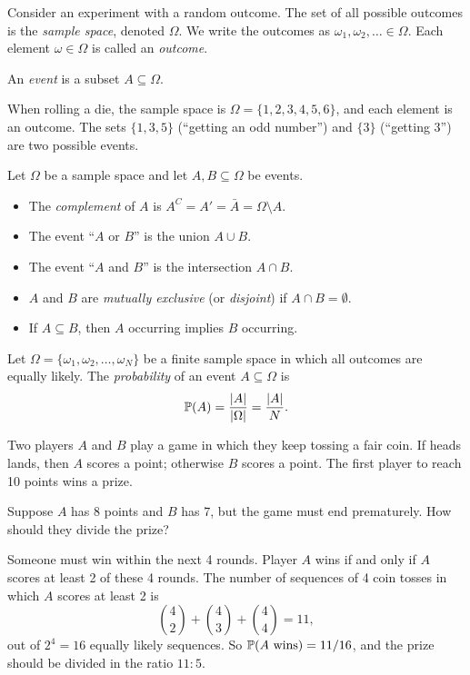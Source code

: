 \documentclass[a4paper]{article}
\begin{document}
\begin{defi}
  Consider an experiment with a random outcome. The set of all possible outcomes is the \emph{sample space}, denoted $\Omega$. We write the outcomes as $\omega_1, \omega_2, \dotsc \in \Omega$. Each element $\omega \in \Omega$ is called an \emph{outcome}.
\end{defi}

\begin{defi}[Event]
  An \emph{event} is a subset $A \subseteq \Omega$.
\end{defi}

\begin{eg}
  When rolling a die, the sample space is $\Omega = \{1, 2, 3, 4, 5, 6\}$, and each element is an outcome. The sets $\{1, 3, 5\}$ (``getting an odd number'') and $\{3\}$ (``getting 3'') are two possible events.
\end{eg}

\begin{defi}
  Let $\Omega$ be a sample space and let $A, B\subseteq \Omega$ be events.
  \begin{itemize}
    \item The \emph{complement} of $A$ is $A^C = A' = \bar A = \Omega\setminus A$.
    \item The event ``$A$ or $B$'' is the union $A\cup B$.
    \item The event ``$A$ and $B$'' is the intersection $A\cap B$.
    \item $A$ and $B$ are \emph{mutually exclusive} (or \emph{disjoint}) if $A\cap B = \emptyset$.
    \item If $A\subseteq B$, then $A$ occurring implies $B$ occurring.
  \end{itemize}
\end{defi}

\begin{defi}
  Let $\Omega = \{\omega_1,\omega_2, \dotsc, \omega_N\}$ be a finite sample space in which all outcomes are equally likely. The \emph{probability} of an event $A\subseteq \Omega$ is
  \[
    \P(A) = \frac{|A|}{|\Omega|} = \frac{|A|}{N}.
  \]
\end{defi}

\begin{eg}
  Two players $A$ and $B$ play a game in which they keep tossing a fair coin. If heads lands, then $A$ scores a point; otherwise $B$ scores a point. The first player to reach 10 points wins a prize.

  Suppose $A$ has 8 points and $B$ has 7, but the game must end prematurely. How should they divide the prize?

  Someone must win within the next 4 rounds. Player $A$ wins if and only if $A$ scores at least 2 of these 4 rounds. The number of sequences of 4 coin tosses in which $A$ scores at least 2 is
  \[
    \binom{4}{2} + \binom{4}{3} + \binom{4}{4} = 11,
  \]
  out of $2^4 = 16$ equally likely sequences. So $\P(A \text{ wins}) = 11/16$, and the prize should be divided in the ratio $11:5$.
\end{eg}
\end{document}
